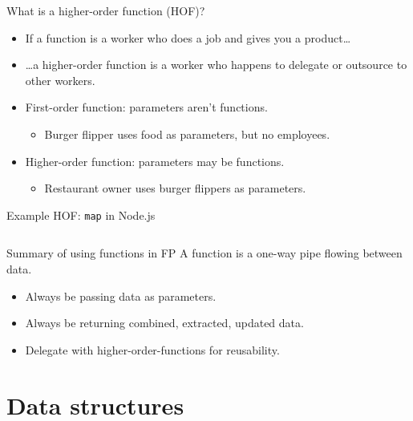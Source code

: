 \begin{frame}{What is a higher-order function (HOF)?}
  \begin{itemize}
  \item If a function is a worker who does a job and gives you a product\ldots
  \item \ldots{}a higher-order function is a worker who happens to
    delegate or outsource to other workers.
  \end{itemize}

  \begin{itemize}
  \item First-order function: parameters aren't functions.
    \begin{itemize}
    \item Burger flipper uses food as parameters, but no employees.
    \end{itemize}
  \item Higher-order function: parameters may be functions.
    \begin{itemize}
    \item Restaurant owner uses burger flippers as parameters.
    \end{itemize}
  \end{itemize}
\end{frame}

\begin{frame}[fragile]{Example HOF: \texttt{map} in Node.js}
  \inputminted{js}{mapGreeters.js}
\end{frame}

\begin{frame}{Summary of using functions in FP}
  A function is a one-way pipe flowing between data.
  \begin{itemize}
  \item Always be passing data as parameters.
  \item Always be returning combined, extracted, updated data.
  \item Delegate with higher-order-functions for reusability.
  \end{itemize}
\end{frame}

\section{Data structures}

